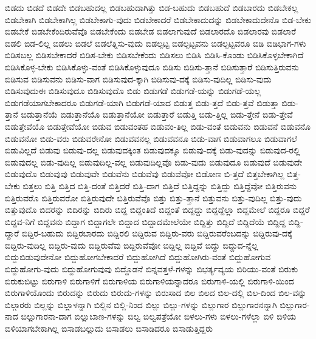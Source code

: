 {ಬಿಡದು
ಬಿಡದೆ
ಬಿಡದೇ
ಬಿಡಬಹುದಲ್ಲ
ಬಿಡಬಹುದಾಗಿತ್ತು
ಬಿಡ-ಬಹುದು
ಬಿಡಬಹುದೆ
ಬಿಡಬಾರದು
ಬಿಡಬೇಕಲ್ಲ
ಬಿಡಬೇಕಾಗಿ
ಬಿಡಬೇಕಾಗಿಲ್ಲ
ಬಿಡಬೇಕಾಗು-ವುದು
ಬಿಡಬೇಕಾದರೆ
ಬಿಡಬೇಕಾದುದನ್ನು
ಬಿಡಬೇಕಾದುದೇನೊ
ಬಿಡ-ಬೇಕು
ಬಿಡಬೇಕೆ
ಬಿಡಬೇಕೆಂದಿರುವೆವೊ
ಬಿಡಬೇಕೆಂದು
ಬಿಡಬೇಡ
ಬಿಡಲಾಗುವುದೆ
ಬಿಡಲಾರದೊ
ಬಿಡಲಾರವು
ಬಿಡಲಾರೆ
ಬಿಡಲಿ
ಬಿಡ-ಲಿಲ್ಲ
ಬಿಡಲು
ಬಿಡಲೆ
ಬಿಡಲೆತ್ನಿಸು-ವುದು
ಬಿಡಲ್ಪಟ್ಟ
ಬಿಡಲ್ಪಟ್ಟವನು
ಬಿಡಲ್ಪಟ್ಟವರೂ
ಬಿಡಿ
ಬಿಡಿಭಾಗ-ಗಳು
ಬಿಡಿಸಬಲ್ಲ
ಬಿಡಿಸಬೇಕಾದರೆ
ಬಿಡಿಸ-ಬೇಕು
ಬಿಡಿಸಬೇಕೆಂದು
ಬಿಡಿಸಲು
ಬಿಡಿಸಿ
ಬಿಡಿಸಿ-ಕೊಂಡು
ಬಿಡಿಸಿಕೊಳ್ಳಬೇಕಾಗಿದೆ
ಬಿಡಿಸಿಕೊಳ್ಳ-ಬೇಕು
ಬಿಡಿಸಿಕೊಳ್ಳು-ವಂತೆ
ಬಿಡಿಸಿಕೊಳ್ಳುವುದೂ
ಬಿಡಿಸು
ಬಿಡಿಸು-ತ್ತಾನೆ
ಬಿಡಿಸುತ್ತಾರೆ
ಬಿಡಿಸುತ್ತಿರುವನು
ಬಿಡಿಸುವ
ಬಿಡಿಸುವನು
ಬಿಡಿಸು-ವಾಗ
ಬಿಡಿಸುವುದ-ಕ್ಕಾಗಿ
ಬಿಡಿಸುವು-ದಕ್ಕೆ
ಬಿಡಿಸು-ವುದಿಲ್ಲ
ಬಿಡಿಸು-ವುದು
ಬಿಡಿಸುವುದುಈ
ಬಿಡಿಸುವುದೂ
ಬಿಡಿಸುವುದೊ
ಬಿಡು
ಬಿಡುಗಡೆ
ಬಿಡುಗಡೆ-ಯನ್ನು
ಬಿಡುಗಡೆ-ಯಲ್ಲ
ಬಿಡುಗಡೆಯಾಗಬೇಕಾದರೂ
ಬಿಡುಗಡೆ-ಯಾಗಿ
ಬಿಡುಗಡೆ-ಯಾದ
ಬಿಡುತ್ತ
ಬಿಡು-ತ್ತದೆ
ಬಿಡು-ತ್ತವೆ
ಬಿಡುತ್ತಾ
ಬಿಡು-ತ್ತಾನೆ
ಬಿಡುತ್ತಾನೆಯೆ
ಬಿಡುತ್ತಾನೆಯೊ
ಬಿಡುತ್ತಾನೆಯೋ
ಬಿಡುತ್ತಾರೆ
ಬಿಡುತ್ತಿ
ಬಿಡು-ತ್ತಿಲ್ಲ
ಬಿಡು-ತ್ತೇನೆ
ಬಿಡು-ತ್ತೇವೆ
ಬಿಡುತ್ತೇವೆಯೊ
ಬಿಡುತ್ತೇವೆಯೋ
ಬಿಡುವ
ಬಿಡುವಂತಹ
ಬಿಡುವಂ-ತಿಲ್ಲ
ಬಿಡು-ವಂತೆ
ಬಿಡುವನು
ಬಿಡುವನೆ
ಬಿಡುವನೊ
ಬಿಡುವನೋ
ಬಿಡು-ವರು
ಬಿಡುವರೇನೋ
ಬಿಡುವವನಲ್ಲ
ಬಿಡುವವನೂ
ಬಿಡು-ವಾಗ
ಬಿಡುವಾಗಲೂ
ಬಿಡುವಾಗಲೆ
ಬಿಡುವಿಲ್ಲದೆ
ಬಿಡುವು
ಬಿಡುವು-ದಲ್ಲ
ಬಿಡುವುದಕ್ಕಿಂತ
ಬಿಡುವುದಕ್ಕೂ
ಬಿಡುವು-ದಕ್ಕೆ
ಬಿಡು-ವುದನ್ನು
ಬಿಡುವುದ-ರಲ್ಲಿ
ಬಿಡುವುದಲ್ಲ
ಬಿಡು-ವುದಿಲ್ಲ
ಬಿಡುವುದಿಲ್ಲ-ವಲ್ಲ
ಬಿಡುವುದಿಲ್ಲವೊ
ಬಿಡು-ವುದು
ಬಿಡುವುದೂ
ಬಿಡುವುದೆ
ಬಿಡುವುದೇ
ಬಿಡುವುದೊ
ಬಿಡುವುವು
ಬಿಡುವುವೇ
ಬಿಡುವೆನು
ಬಿಡುವೆವು
ಬಿಡುವೆವೋ
ಬಿಡೋಣ
ಬಿ-ತ್ತದೆ
ಬಿತ್ತಬೇಕಾಗಿಲ್ಲ
ಬಿತ್ತ-ಬೇಕು
ಬಿತ್ತಲು
ಬಿತ್ತಿ
ಬಿತ್ತಿದ
ಬಿತ್ತಿ-ದಂತೆ
ಬಿತ್ತಿದರೆ
ಬಿತ್ತಿ-ದಾಗ
ಬಿತ್ತಿದೆ
ಬಿತ್ತಿದ್ದನ್ನು
ಬಿತ್ತಿದ್ದು
ಬಿತ್ತಿದ್ದೆವೋ
ಬಿತ್ತಿರುವನು
ಬಿತ್ತಿರುವರೊ
ಬಿತ್ತಿರುವರೋ
ಬಿತ್ತಿರುವುದೇ
ಬಿತ್ತಿರುವೆವೊ
ಬಿತ್ತು
ಬಿತ್ತು-ತ್ತಾನೆ
ಬಿತ್ತುವನು
ಬಿತ್ತು-ವುದಿಲ್ಲ
ಬಿತ್ತು-ವುದು
ಬಿತ್ತುವುದೊ
ಬಿದರನ್ನು
ಬಿದಿರನ್ನು
ಬಿದಿರು
ಬಿದ್ದ
ಬಿದ್ದಂತಿದೆ
ಬಿದ್ದಂತೆ
ಬಿದ್ದದ್ದು
ಬಿದ್ದದ್ದೆಲ್ಲಾ
ಬಿದ್ದಮೇಲೆ
ಬಿದ್ದರೂ
ಬಿದ್ದರೆ
ಬಿದ್ದವ-ನಿಗೆ
ಬಿದ್ದವನು
ಬಿದ್ದಾಗ
ಬಿದ್ದಾಗಲೇ
ಬಿದ್ದಾದ
ಬಿದ್ದಾದಮೇಲೆಯೇ
ಬಿದ್ದಿತ್ತು
ಬಿದ್ದಿದೆ
ಬಿದ್ದಿದೆಯೆ
ಬಿದ್ದಿದ್ದ
ಬಿದ್ದಿ-ದ್ದಾರೆ
ಬಿದ್ದಿರ-ಬಹುದು
ಬಿದ್ದಿರಬಾರದು
ಬಿದ್ದಿರಲಿ
ಬಿದ್ದಿರುವ
ಬಿದ್ದಿರು-ವರು
ಬಿದ್ದಿರುವರೆಂಬದನ್ನು
ಬಿದ್ದಿರುವು-ದಕ್ಕೆ
ಬಿದ್ದಿರು-ವುದಿಲ್ಲ
ಬಿದ್ದಿರು-ವುದು
ಬಿದ್ದಿರುವೆವು
ಬಿದ್ದಿರುವೆವೋ
ಬಿದ್ದಿಲ್ಲ
ಬಿದ್ದಿವೆ
ಬಿದ್ದು
ಬಿದ್ದುದ-ನ್ನೆಲ್ಲ
ಬಿದ್ದುಬಿಡುವುದೇನೋ
ಬಿದ್ದುಹೋಗಬೇಕಾದರೆ
ಬಿದ್ದುಹೋಗಿದೆ
ಬಿದ್ದುಹೋಗಿರು-ವಂತೆ
ಬಿದ್ದುಹೋಗುವ
ಬಿದ್ದುಹೋಗು-ವುದು
ಬಿದ್ದುಹೋಗುವುವು
ಬಿದ್ದೊಡನೆ
ಬಿನ್ನವತ್ತಳೆ-ಗಳನ್ನು
ಬಿಭರ್ತ್ಯವ್ಯಯ
ಬಿರಿಯು-ವಂತೆ
ಬಿರುಕು
ಬಿರುಕುಬಿಟ್ಟು
ಬಿರುಗಾಳಿ
ಬಿರುಗಾಳಿಗೆ
ಬಿರುಗಾಳಿಯ
ಬಿರುಗಾಳಿಯನ್ನಾದರೂ
ಬಿರುಗಾಳಿ-ಯಲ್ಲಿ
ಬಿರುಗಾಳಿ-ಯಿಂದ
ಬಿರುಗಾಳಿಯೊಂದು
ಬಿರುದನ್ನು
ಬಿರುದು
ಬಿರುದು-ಗಳನ್ನು
ಬಿರುಸಾದ
ಬಿಲ
ಬಿಲದ
ಬಿಲ-ದಲ್ಲಿ
ಬಿಲ-ದಿಂದ
ಬಿಲ-ವನ್ನು
ಬಿಲ್ಗಾರರು
ಬಿಲ್ಲನ್ನು
ಬಿಲ್ಲಾಳನ್ನಾಗಿ
ಬಿಲ್ಲಿನ
ಬಿಲ್ಲಿ-ನಿಂದ
ಬಿಲ್ಲು
ಬಿಲ್ಲು-ಗಳನ್ನು
ಬಿಲ್ಲುಗಾರ
ಬಿಲ್ಲುಗಾರನನ್ನಾಗಿ
ಬಿಲ್ಲುಗಾರ-ನಾದ
ಬಿಲ್ಲುಗಾರನಾ-ದಾಗ
ಬಿಲ್ಲುಬಾಣ-ಗಳನ್ನು
ಬಿಲ್ವ
ಬಿಲ್ವಪತ್ರೆಯೋ
ಬಿಳಲು-ಗಳು
ಬಿಳಲು-ಗಳೆಲ್ಲಾ
ಬಿಳಿ
ಬಿಳಿಯ
ಬಿಳಿಯಾಗಬೇಕಾಗಿಲ್ಲ
ಬಿಸಾಡಬಲ್ಲುದು
ಬಿಸಾಡಲು
ಬಿಸಾಡಿದರೂ
ಬಿಸಾಡುತ್ತಿದ್ದರು
}
